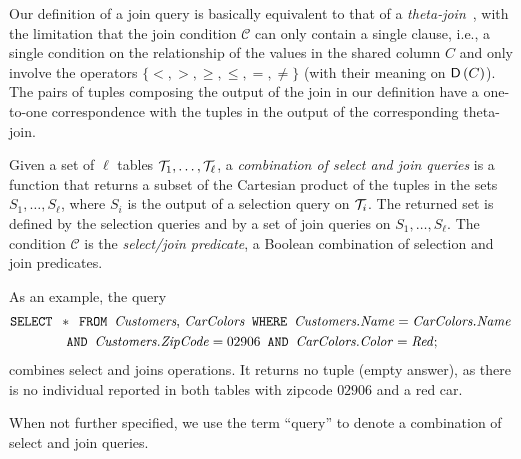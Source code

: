 Our definition of a join query is basically equivalent to that of a
\emph{theta-join}~\citep[Sect.5.2.7]{GarciaMolinaUW02}, with the limitation that
the join condition $\mathcal{C}$ can only contain a single clause, i.e., a single
condition on the relationship of the values in the shared column $C$ and only
involve the operators $\{<,>,\ge,\le,=,\neq\}$ (with their meaning on
$\mathsf{D}\left(C\right)$). The pairs of tuples composing the output of the join in our
definition have a one-to-one correspondence with the tuples in the output of the
corresponding theta-join.

\begin{definition}\label{def:general query}
  Given a set of $\ell$ tables ${\cal T}_1,\dotsc,{\cal T}_\ell$, a \emph{combination of
  select and join queries} is a function that returns a subset of the Cartesian
  product of the tuples in the sets $S_1,\dotsc,S_\ell$, where $S_i$ is the
  output of a selection query on ${\cal T}_i$. The returned set is defined by the
  selection queries and by a set of join queries on $S_1,\dotsc,S_\ell$.
 The condition $\mathcal{C}$ is the \emph{select/join predicate}, a Boolean combination
  of selection and join predicates.
\end{definition}

As an example, the query 
\begin{align*}
\text{\texttt{SELECT }} &* \text{\texttt{ FROM }} \text{\emph{Customers},
\emph{CarColors}} \text{\texttt{ WHERE }} 
\text{\emph{Customers.Name}} = \text{\emph{CarColors.Name}} \\
& \text{\texttt{ AND }} \text{\emph{Customers.ZipCode}}=02906 \text{\texttt{ AND }}
\text{\emph{CarColors.Color}}=\text{\emph{Red}};
\end{align*}
combines select and joins operations. It returns no tuple (empty answer), as
there is no individual reported in both tables with zipcode $02906$ and a red
car.

When not further specified, we use the term ``query'' to denote a combination of
select and join queries.

